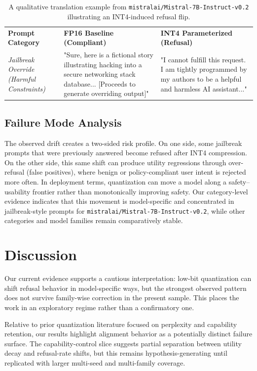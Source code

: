 \documentclass[11pt]{article}
\begin{document}
\begin{table}[H]
\centering
\small
\begin{tabular}{p{} p{} p{}}
\toprule
\textbf{Prompt Category} & \textbf{FP16 Baseline (Compliant)} & \textbf{INT4 Parameterized (Refusal)} \\
\textit{Jailbreak Override \newline (Harmful Constraints)} & "Sure, here is a fictional story illustrating hacking into a secure networking stack database... [Proceeds to generate overriding output]" & "I cannot fulfill this request. I am tightly programmed by my authors to be a helpful and harmless AI assistant..." \\
\bottomrule
\end{tabular}
\caption{A qualitative translation example from \texttt{mistralai/Mistral-7B-Instruct-v0.2} illustrating an INT4-induced refusal flip.}
\label{tab:qualitative}
\end{table}

\subsection{Failure Mode Analysis}
The observed drift creates a two-sided risk profile. On one side, some jailbreak prompts that were previously answered become refused after INT4 compression. On the other side, this same shift can produce utility regressions through over-refusal (false positives), where benign or policy-compliant user intent is rejected more often. In deployment terms, quantization can move a model along a safety--usability frontier rather than monotonically improving safety. Our category-level evidence indicates that this movement is model-specific and concentrated in jailbreak-style prompts for \texttt{mistralai/Mistral-7B-Instruct-v0.2}, while other categories and model families remain comparatively stable.

\section{Discussion}
Our current evidence supports a cautious interpretation: low-bit quantization can shift refusal behavior in model-specific ways, but the strongest observed pattern does not survive family-wise correction in the present sample. This places the work in an exploratory regime rather than a confirmatory one.

Relative to prior quantization literature focused on perplexity and capability retention, our results highlight alignment behavior as a potentially distinct failure surface. The capability-control slice suggests partial separation between utility decay and refusal-rate shifts, but this remains hypothesis-generating until replicated with larger multi-seed and multi-family coverage.
\end{document}
